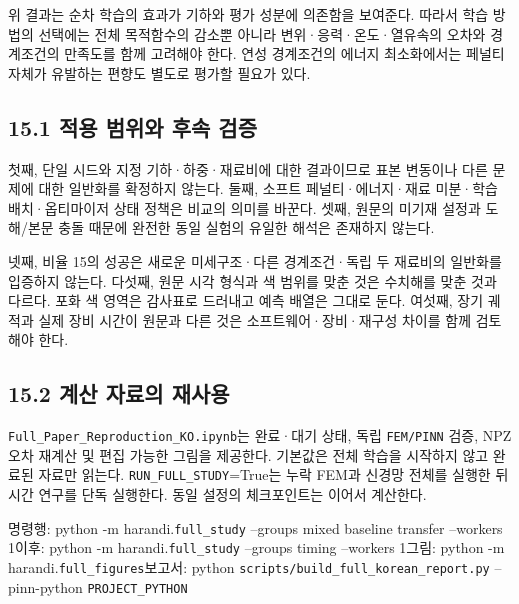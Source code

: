 \documentclass[10pt,a4paper]{article}
\begin{document}
위 결과는 순차 학습의 효과가 기하와 평가 성분에 의존함을 보여준다. 따라서 학습 방법의 선택에는 전체 목적함수의 감소뿐 아니라 변위·응력·온도·열유속의 오차와 경계조건의 만족도를 함께 고려해야 한다. 연성 경계조건의 에너지 최소화에서는 페널티 자체가 유발하는 편향도 별도로 평가할 필요가 있다.\par

\subsection{15.1 적용 범위와 후속 검증}

첫째, 단일 시드와 지정 기하·하중·재료비에 대한 결과이므로 표본 변동이나 다른 문제에 대한 일반화를 확정하지 않는다. 둘째, 소프트 페널티·에너지·재료 미분·학습 배치·옵티마이저 상태 정책은 비교의 의미를 바꾼다. 셋째, 원문의 미기재 설정과 도해/본문 충돌 때문에 완전한 동일 실험의 유일한 해석은 존재하지 않는다.\par

넷째, 비율 15의 성공은 새로운 미세구조·다른 경계조건·독립 두 재료비의 일반화를 입증하지 않는다. 다섯째, 원문 시각 형식과 색 범위를 맞춘 것은 수치해를 맞춘 것과 다르다. 포화 색 영역은 감사표로 드러내고 예측 배열은 그대로 둔다. 여섯째, 장기 궤적과 실제 장비 시간이 원문과 다른 것은 소프트웨어·장비·재구성 차이를 함께 검토해야 한다.\par

\subsection{15.2 계산 자료의 재사용}

\nolinkurl{Full_Paper_Reproduction_KO.ipynb}는 완료·대기 상태, 독립 \nolinkurl{FEM/PINN} 검증, NPZ 오차 재계산 및 편집 가능한 그림을 제공한다. 기본값은 전체 학습을 시작하지 않고 완료된 자료만 읽는다. \nolinkurl{RUN_FULL_STUDY}=True는 누락 FEM과 신경망 전체를 실행한 뒤 시간 연구를 단독 실행한다. 동일 설정의 체크포인트는 이어서 계산한다.\par

{\small\color{muted} 명령행: python -m harandi.\nolinkurl{full_study} --groups mixed baseline transfer --workers 1\newline 이후: python -m harandi.\nolinkurl{full_study} --groups timing --workers 1\newline 그림: python -m harandi.\nolinkurl{full_figures}\newline 보고서: python \nolinkurl{scripts/build_full_korean_report.py} --pinn-python \nolinkurl{PROJECT_PYTHON}\par}
\end{document}
